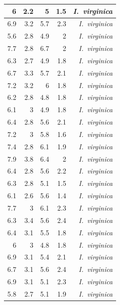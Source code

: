\begin{enumerate}
\begin{center}
\begin{longtable}{|r|r|r|r|r|}
				\hline
				6     & 2.2   & 5     & 1.5   & \textit{I. virginica} \\
				\hline
				6.9   & 3.2   & 5.7   & 2.3   & \textit{I. virginica} \\
				\hline
				5.6   & 2.8   & 4.9   & 2     & \textit{I. virginica} \\
				\hline
				7.7   & 2.8   & 6.7   & 2     & \textit{I. virginica} \\
				\hline
				6.3   & 2.7   & 4.9   & 1.8   & \textit{I. virginica} \\
				\hline
				6.7   & 3.3   & 5.7   & 2.1   & \textit{I. virginica} \\
				\hline
				7.2   & 3.2   & 6     & 1.8   & \textit{I. virginica} \\
				\hline
				6.2   & 2.8   & 4.8   & 1.8   & \textit{I. virginica} \\
				\hline
				6.1   & 3     & 4.9   & 1.8   & \textit{I. virginica} \\
				\hline
				6.4   & 2.8   & 5.6   & 2.1   & \textit{I. virginica} \\
				\hline
				7.2   & 3     & 5.8   & 1.6   & \textit{I. virginica} \\
				\hline
				7.4   & 2.8   & 6.1   & 1.9   & \textit{I. virginica} \\
				\hline
				7.9   & 3.8   & 6.4   & 2     & \textit{I. virginica} \\
				\hline
				6.4   & 2.8   & 5.6   & 2.2   & \textit{I. virginica} \\
				\hline
				6.3   & 2.8   & 5.1   & 1.5   & \textit{I. virginica} \\
				\hline
				6.1   & 2.6   & 5.6   & 1.4   & \textit{I. virginica} \\
				\hline
				7.7   & 3     & 6.1   & 2.3   & \textit{I. virginica} \\
				\hline
				6.3   & 3.4   & 5.6   & 2.4   & \textit{I. virginica} \\
				\hline
				6.4   & 3.1   & 5.5   & 1.8   & \textit{I. virginica} \\
				\hline
				6     & 3     & 4.8   & 1.8   & \textit{I. virginica} \\
				\hline
				6.9   & 3.1   & 5.4   & 2.1   & \textit{I. virginica} \\
				\hline
				6.7   & 3.1   & 5.6   & 2.4   & \textit{I. virginica} \\
				\hline
				6.9   & 3.1   & 5.1   & 2.3   & \textit{I. virginica} \\
				\hline
				5.8   & 2.7   & 5.1   & 1.9   & \textit{I. virginica} \\

\end{longtable}
\end{center}
\end{enumerate}
